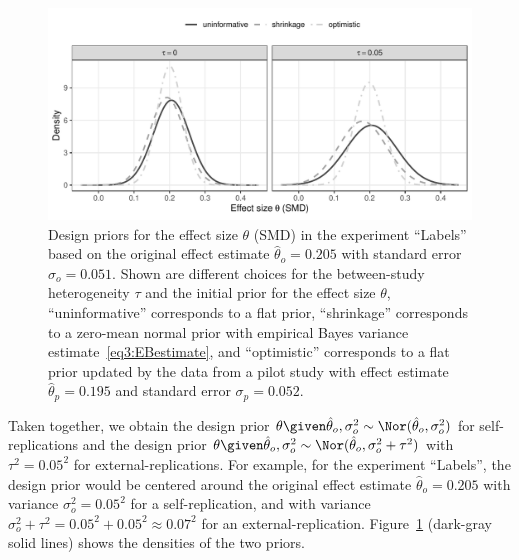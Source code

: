 \begin{figure}[!ht]
\begin{knitrout}
\color{fgcolor}
\includegraphics[width=\textwidth]{images/paper3/example-design-prior-1}
\end{knitrout}

\caption{Design priors for the effect size $\theta$ (SMD) in the experiment
  ``Labels'' based on the original effect estimate
  $\hat{\theta}_{o} = 0.205$ with standard error
  $\sigma_{o} = 0.051$. Shown are different
  choices for the between-study heterogeneity $\tau$ and the initial prior for
  the effect size $\theta$, ``uninformative'' corresponds to a flat prior,
  ``shrinkage'' corresponds to a zero-mean normal prior with empirical Bayes
  variance estimate~\eqref{eq3:EBestimate}, and ``optimistic'' corresponds to a
  flat prior updated by the data from a pilot study with effect estimate
  $\hat{\theta}_{p} = 0.195$ and standard error
  $\sigma_{p} = 0.052$.}
\label{fig3:dpexample}
\end{figure}



Taken together, we obtain the design prior
$\theta \given \hat{\theta}_{o}, \sigma^{2}_{o} \sim \Nor(\hat{\theta}_{o}, \sigma^{2}_{o})$
for self-replications and the design prior
$\theta \given \hat{\theta}_{o}, \sigma^{2}_{o} \sim \Nor(\hat{\theta}_{o}, \sigma^{2}_{o} + \tau^{2})$
with $\tau^{2} = 0.05^{2}$ for external-replications. For
example, for the experiment ``Labels'', the design prior would be
centered around the original effect estimate
$\hat{\theta}_{o} = 0.205$ with variance
$\sigma^{2}_{o} = 0.05^{2}$ for a
self-replication, and with variance
$\sigma^{2}_{o} + \tau^{2} = 0.05^{2} + 0.05^{2} \approx 0.07^{2}$
for an external-replication. Figure~\ref{fig3:dpexample} (dark-gray solid lines)
shows the densities of the two priors.

